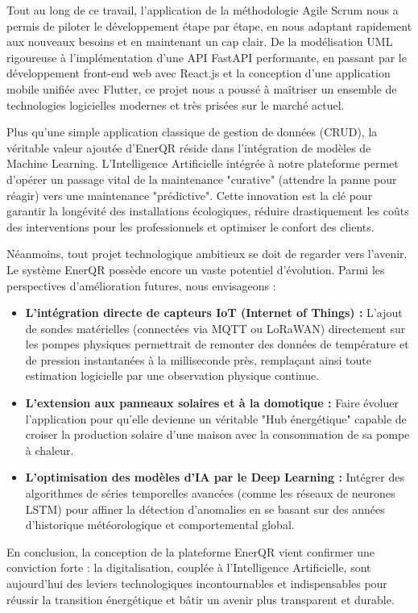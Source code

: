 \documentclass[12pt,a4paper]{report}
\begin{document}
Tout au long de ce travail, l'application de la méthodologie Agile Scrum nous a permis de piloter le développement étape par étape, en nous adaptant rapidement aux nouveaux besoins et en maintenant un cap clair. De la modélisation UML rigoureuse à l'implémentation d'une API FastAPI performante, en passant par le développement front-end web avec React.js et la conception d'une application mobile unifiée avec Flutter, ce projet nous a poussé à maîtriser un ensemble de technologies logicielles modernes et très prisées sur le marché actuel.

Plus qu'une simple application classique de gestion de données (CRUD), la véritable valeur ajoutée d'EnerQR réside dans l'intégration de modèles de Machine Learning. L'Intelligence Artificielle intégrée à notre plateforme permet d'opérer un passage vital de la maintenance "curative" (attendre la panne pour réagir) vers une maintenance "prédictive". Cette innovation est la clé pour garantir la longévité des installations écologiques, réduire drastiquement les coûts des interventions pour les professionnels et optimiser le confort des clients.

Néanmoins, tout projet technologique ambitieux se doit de regarder vers l'avenir. Le système EnerQR possède encore un vaste potentiel d'évolution. Parmi les perspectives d'amélioration futures, nous envisageons :
\begin{itemize}
    \item \textbf{L'intégration directe de capteurs IoT (Internet of Things) :} L'ajout de sondes matérielles (connectées via MQTT ou LoRaWAN) directement sur les pompes physiques permettrait de remonter des données de température et de pression instantanées à la milliseconde près, remplaçant ainsi toute estimation logicielle par une observation physique continue.
    \item \textbf{L'extension aux panneaux solaires et à la domotique :} Faire évoluer l'application pour qu'elle devienne un véritable "Hub énergétique" capable de croiser la production solaire d'une maison avec la consommation de sa pompe à chaleur.
    \item \textbf{L'optimisation des modèles d'IA par le Deep Learning :} Intégrer des algorithmes de séries temporelles avancées (comme les réseaux de neurones LSTM) pour affiner la détection d'anomalies en se basant sur des années d'historique météorologique et comportemental global.
\end{itemize}

En conclusion, la conception de la plateforme EnerQR vient confirmer une conviction forte : la digitalisation, couplée à l'Intelligence Artificielle, sont aujourd'hui des leviers technologiques incontournables et indispensables pour réussir la transition énergétique et bâtir un avenir plus transparent et durable.
\end{document}
